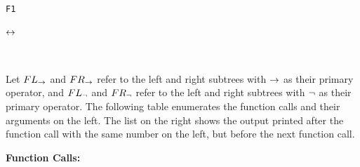 \documentclass[]{exam}
\begin{document}
\begin{questions}
\texttt{F1}  \\
\setlength{\GapWidth}{8mm}
\setlength{\GapDepth}{8mm}
\begin{bundle}{$\mathbin{\leftrightarrow}$}
\end{bundle}\\
\begin{solution}
Let $FL_{\mathbin{\rightarrow}}$ and $FR_{\mathbin{\rightarrow}}$ refer to the left and right subtrees with $\mathbin{\rightarrow}$ as their
primary operator, and $FL_{\mathop{\neg}}$ and $FR_{\mathop{\neg}}$ refer to the left and right
subtrees with $\mathop{\neg}$ as their primary operator. The following table enumerates
the function calls and their arguments on the left. The list on the right shows
the output printed after the function call with the same number on the left, but
before the next function call.
\begin{multicols}{2}
{ \bf Function Calls:}


\end{multicols}
\end{solution}
\end{questions}
\end{document}
